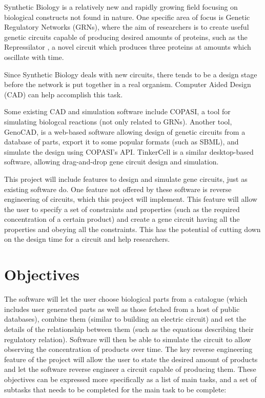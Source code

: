\documentclass{article}
\begin{document}
	\par Synthetic Biology is a relatively new and rapidly growing field focusing on biological constructs not found in nature. One specific area of focus is Genetic Regulatory Networks (GRNs), where the aim of researchers is to create useful genetic circuits capable of producing desired amounts of proteins, such as the Repressilator \cite{repressilator}, a novel circuit which produces three proteins at amounts which oscillate with time.
	\par Since Synthetic Biology deals with new circuits, there tends to be a design stage before the network is put together in a real organism. Computer Aided Design (CAD) can help accomplish this task.
	\par Some existing CAD and simulation software include COPASI\cite{copasi}, a tool for simulating biologcal reactions (not only related to GRNs). Another tool, GenoCAD\cite{genocad}, is a web-based software allowing design of genetic circuits from a database of parts, export it to some popular formats (such as SBML), and simulate the design using COPASI's API. TinkerCell\cite{tinkercell} is a similar desktop-based software, allowing drag-and-drop gene circuit design and simulation.
	\par This project will include features to design and simulate gene circuits, just as existing software do. One feature not offered by these software is reverse engineering of circuits, which this project will implement. This feature will allow the user to specify a set of constraints and properties (such as the required concentration of a certain product) and create a gene circuit having all the properties and obeying all the constraints. This has the potential of cutting down on the design time for a circuit and help researchers.
	
	
	
	
	
	\section{Objectives}
	\par The software will let the user choose biological parts from a catalogue (which includes user generated parts as well as those fetched from a host of public databases), combine them (similar to building an electric circuit) and set the details of the relationship between them (such as the equations describing their regulatory relation). Software will then be able to simulate the circuit to allow observing the concentration of products over time. The key reverse engineering feature of the project will allow the user to state the desired amount of products and let the software reverse engineer a circuit capable of producing them. These objectives can be expressed more specifically as a list of main tasks, and a set of subtasks that needs to be completed for the main task to be complete:
	
\end{document}
